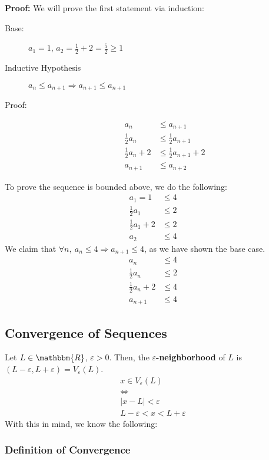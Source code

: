 \documentclass[10pt]{extarticle}
\newcommand{\R}{\mathbbm{R}}
\begin{document}
    \textbf{Proof:} We will prove the first statement via induction:
    \begin{description}
      \item[Base:] $a_1 = 1$, $a_2 = \frac{1}{2} + 2 = \frac{5}{2} \geq 1$
      \item[Inductive Hypothesis] $a_n \leq a_{n+1} \Rightarrow a_{n+1} \leq a_{n+1}$
      \item[Proof:]
        \begin{align*}
          a_{n} &\leq a_{n+1}\\
          \frac{1}{2}a_n &\leq \frac{1}{2}a_{n+1}\\
          \frac{1}{2}a_n + 2 &\leq \frac{1}{2}a_{n+1} + 2\\
          a_{n+1} &\leq a_{n+2}
        \end{align*}
    \end{description}
    To prove the sequence is bounded above, we do the following:
    \begin{align*}
      a_1 = 1 &\leq 4\\
      \frac{1}{2}a_1 &\leq 2\\
      \frac{1}{2}a_1 + 2 &\leq 2\\
      a_{2} &\leq 4
    \end{align*}
    We claim that $\forall n,~a_n \leq 4 \Rightarrow a_{n+1} \leq 4$, as we have shown the base case.
    \begin{align*}
      a_{n} &\leq 4\\
      \frac{1}{2}a_n &\leq 2\\
      \frac{1}{2}a_n + 2 &\leq 4\\
      a_{n+1} &\leq 4
    \end{align*}
  \subsection{Convergence of Sequences}%
    Let $L\in\R$, $\varepsilon > 0$. Then, the $\varepsilon$\textbf{-neighborhood} of $L$ is $(L-\varepsilon, L+\varepsilon) = V_{\varepsilon}(L)$.
    \begin{align*}
      x\in V_{\varepsilon}(L)\\
      \Leftrightarrow\\
      |x-L| < \varepsilon\\
      L-\varepsilon < x < L+\varepsilon
    \end{align*}
    With this in mind, we know the following:
    \subsubsection{Definition of Convergence}%
    
\end{document}
